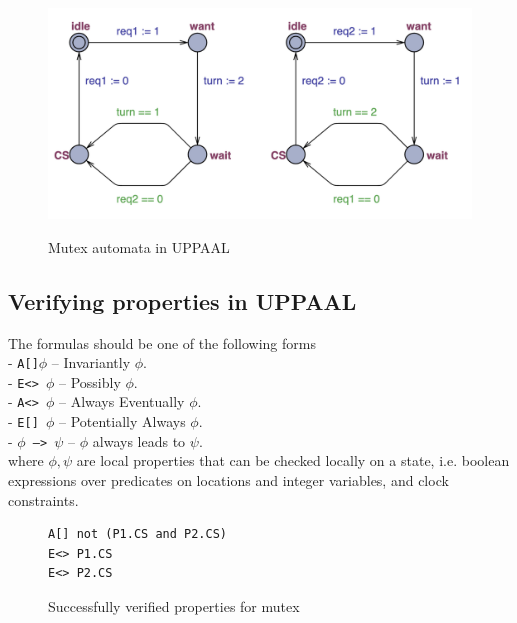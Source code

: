 \begin{figure}[H]
\caption{Mutex automata in UPPAAL \cite{SmallTutorial2009}}
\includegraphics[width=\textwidth]{images/mutex.png}
\label{fig:mutex_uppaal}
\end{figure}



\subsection{Verifying properties in UPPAAL}

\begin{definition}
The formulas should be one of the following forms\\
- \texttt{A[]$\phi$} -- Invariantly $\phi$.\\
- \texttt{E<> $\phi$} -- Possibly $\phi$.\\
- \texttt{A<> $\phi$} -- Always Eventually $\phi$.\\
- \texttt{E[] $\phi$} -- Potentially Always $\phi$.\\
- \texttt{$\phi$ --> $\psi$} -- $\phi$ always leads to $\psi$.\\
where $\phi, \psi$ are local properties that can be checked locally on a state, i.e. boolean expressions over predicates on locations and integer variables, and clock constraints.
\label{def:quantifiers}
\end{definition}


\begin{figure}[H]
\caption{Successfully verified properties for mutex \cite{SmallTutorial2009}}
\label{fig:mutex_verification}
\begin{lstlisting}[style=code]
A[] not (P1.CS and P2.CS)
E<> P1.CS
E<> P2.CS
\end{lstlisting}    
\end{figure}